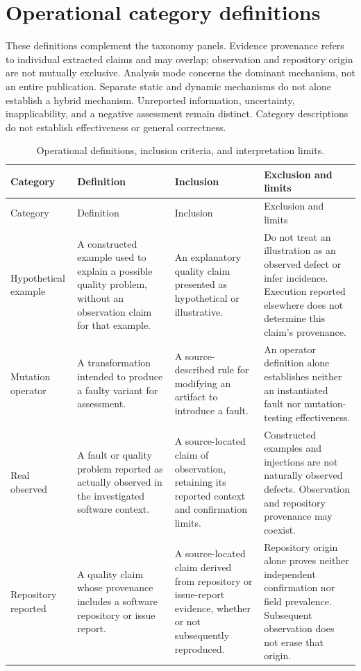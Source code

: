 \section*{Operational category definitions}
These definitions complement the taxonomy panels. Evidence provenance refers to individual extracted claims and may overlap; observation and repository origin are not mutually exclusive. Analysis mode concerns the dominant mechanism, not an entire publication. Separate static and dynamic mechanisms do not alone establish a hybrid mechanism. Unreported information, uncertainty, inapplicability, and a negative assessment remain distinct. Category descriptions do not establish effectiveness or general correctness.
\begingroup
\setlength{\tabcolsep}{4pt}
\begin{longtable}{@{}p{.15\linewidth}p{.27\linewidth}p{.25\linewidth}p{.27\linewidth}@{}}
\caption{Operational definitions, inclusion criteria, and interpretation limits.}\label{tab:operational-definitions}\\
\toprule Category & Definition & Inclusion & Exclusion and limits\\\midrule
\endfirsthead
\toprule Category & Definition & Inclusion & Exclusion and limits\\\midrule
\endhead
\bottomrule\endfoot
Hypothetical example & A constructed example used to explain a possible quality problem, without an observation claim for that example. & An explanatory quality claim presented as hypothetical or illustrative. & Do not treat an illustration as an observed defect or infer incidence. Execution reported elsewhere does not determine this claim's provenance.\\
Mutation operator & A transformation intended to produce a faulty variant for assessment. & A source-described rule for modifying an artifact to introduce a fault. & An operator definition alone establishes neither an instantiated fault nor mutation-testing effectiveness.\\
Real observed & A fault or quality problem reported as actually observed in the investigated software context. & A source-located claim of observation, retaining its reported context and confirmation limits. & Constructed examples and injections are not naturally observed defects. Observation and repository provenance may coexist.\\
Repository reported & A quality claim whose provenance includes a software repository or issue report. & A source-located claim derived from repository or issue-report evidence, whether or not subsequently reproduced. & Repository origin alone proves neither independent confirmation nor field prevalence. Subsequent observation does not erase that origin.\\

\end{longtable}
